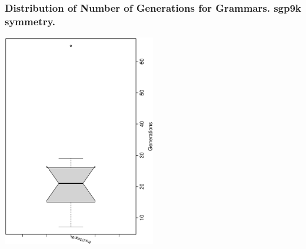  \begin{frame}
 \frametitle{ Distribution of Number of Generations for Grammars. sgp9k  symmetry. }
 \begin{center}
\includegraphics[width=0.5\textwidth, angle=-90]
{ExpFboxplottGenerations007.eps}
 \end{center}
 \label{ExpFboxplottGenerations007.eps}  
 \end{frame}

